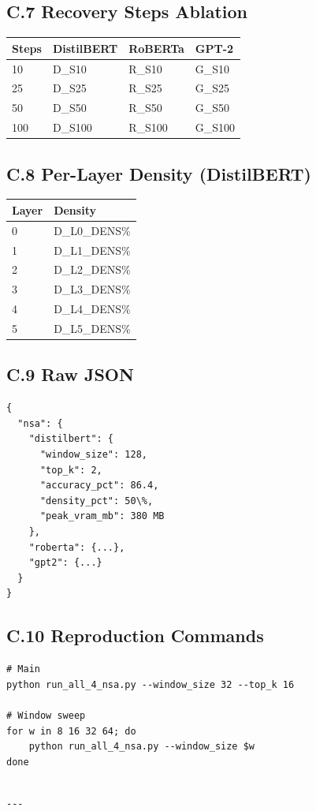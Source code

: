 \subsection{C.7 Recovery Steps Ablation}

\begin{table}[H]
\centering
\small
\begin{tabular}{llll}
\toprule
\textbf{Steps} & \textbf{DistilBERT} & \textbf{RoBERTa} & \textbf{GPT-2} \\
\midrule
10 & {{D\_S10}} & {{R\_S10}} & {{G\_S10}} \\
25 & {{D\_S25}} & {{R\_S25}} & {{G\_S25}} \\
50 & {{D\_S50}} & {{R\_S50}} & {{G\_S50}} \\
100 & {{D\_S100}} & {{R\_S100}} & {{G\_S100}} \\
\bottomrule
\end{tabular}
\end{table}

\subsection{C.8 Per-Layer Density (DistilBERT)}

\begin{table}[H]
\centering
\small
\begin{tabular}{ll}
\toprule
\textbf{Layer} & \textbf{Density} \\
\midrule
0 & {{D\_L0\_DENS}}\% \\
1 & {{D\_L1\_DENS}}\% \\
2 & {{D\_L2\_DENS}}\% \\
3 & {{D\_L3\_DENS}}\% \\
4 & {{D\_L4\_DENS}}\% \\
5 & {{D\_L5\_DENS}}\% \\
\bottomrule
\end{tabular}
\end{table}

\subsection{C.9 Raw JSON}

\begin{lstlisting}
{
  "nsa": {
    "distilbert": {
      "window_size": 128,
      "top_k": 2,
      "accuracy_pct": 86.4,
      "density_pct": 50\%,
      "peak_vram_mb": 380 MB
    },
    "roberta": {...},
    "gpt2": {...}
  }
}
\end{lstlisting}

\subsection{C.10 Reproduction Commands}

\begin{lstlisting}
# Main
python run_all_4_nsa.py --window_size 32 --top_k 16

# Window sweep
for w in 8 16 32 64; do
    python run_all_4_nsa.py --window_size $w
done
\end{lstlisting}
\begin{lstlisting}

---
\end{lstlisting}